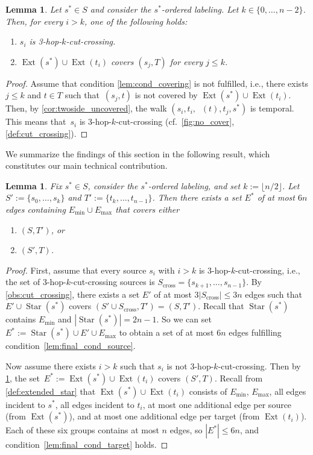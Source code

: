 \documentclass[11pt, letterpaper]{article}
\DeclareMathOperator{\maxmat}{N_{\mathrm{max}}}
\DeclareMathOperator{\ext}{Ext}
\renewcommand{\star}{\operatorname{Star}}
\newcommand{\minedges}{E_{\mathrm{min}}}
\newcommand{\maxedges}{E_{\mathrm{max}}}
\theoremstyle{definition}
\theoremstyle{plain}
\newtheorem{lemma}[definition]{Lemma}
\begin{document}
\begin{lemma}
\label{lem:crossing_or_covering}
Let $s^*\in S$ and consider the $s^*$-ordered labeling. Let $k\in \{0,\dots, n-2\}$. Then, for every $i>k$, one of the following holds:
\begin{enumerate}[label=(\roman*)]
\item $s_i$ is 3-hop-$k$-cut-crossing.
\label{lem:cond_crossing}
\item $\ext(s^*)\cup \ext(t_i)$ covers $(s_j,T)$ for every $j\leq k$.
\label{lem:cond_covering}
\end{enumerate}
\end{lemma}

\begin{proof}
Assume that condition \ref{lem:cond_covering} is not fulfilled, i.e., there exists $j\leq k$ and $t\in T$ such that~$(s_j,t)$ is not covered by $\ext(s^*)\cup \ext(t_i)$.
Then, by \cref{cor:twoside_uncovered}, the walk $(s_i, t_i, \maxmat(t),t_j,s^*)$ is temporal.
This means that~$s_i$ is 3-hop-$k$-cut-crossing (cf.~\cref{fig:no_cover}, \cref{def:cut_crossing}).
\end{proof}

We summarize the findings of this section in the following result, which constitutes our main technical contribution.

\begin{lemma}
\label{lem:final}
Fix $s^*\in S$, consider the $s^*$-ordered labeling, and set $k:=\lfloor n/2 \rfloor$.
Let $S':=\{s_0, \dots, s_k\}$ and $T':=\{t_k, \dots, t_{n-1}\}$.
Then there exists a set $E^*$ of at most $6n$ edges containing $\minedges \cup \maxedges$ that covers either
\begin{enumerate}[label=(\roman*)]
  \item \label{lem:final_cond_source} $(S,T')$, or
  \item \label{lem:final_cond_target} $(S',T)$.
\end{enumerate}
\end{lemma}
\begin{proof}
First, assume that every source $s_i$ with $i>k$ is $3$-hop-$k$-cut-crossing,
i.e., the set of 3-hop-$k$-cut-crossing sources is $S_\mathrm{cross}=\{s_{k+1},\ldots,s_{n-1}\}$.
By \cref{obs:cut_crossing}, there exists a set $E'$ of at most $3|S_\mathrm{cross}|\leq 3n$ edges such that $E'\cup \star(s^*)$ covers $(S'\cup S_\mathrm{cross},T')=(S,T')$.
Recall that $\star(s^*)$ contains $\minedges$ and $|\star(s^*)|=2n-1$.
So we can set $E^*:=\star(s^*)\cup E' \cup \maxedges$ to obtain a set of at most $6n$ edges fulfilling condition~\ref{lem:final_cond_source}.

Now assume there exists $i>k$ such that $s_i$ is not $3$-hop-$k$-cut-crossing.
Then by \cref{lem:crossing_or_covering}, the set~$E^*:=\ext(s^*)\cup \ext(t_i)$ covers $(S',T)$.
Recall from \cref{def:extended_star} that $\ext(s^*)\cup \ext(t_i)$ consists of $\minedges$, $\maxedges$, all edges incident to $s^*$, all edges incident to $t_i$,
at most one additional edge per source (from $\ext(s^*)$), and at most one additional edge per target (from $\ext(t_i)$).
Each of these six groups contains at most $n$ edges, so $|E^*|\leq 6n$,
and condition~\ref{lem:final_cond_target} holds.
\end{proof}
\end{document}
